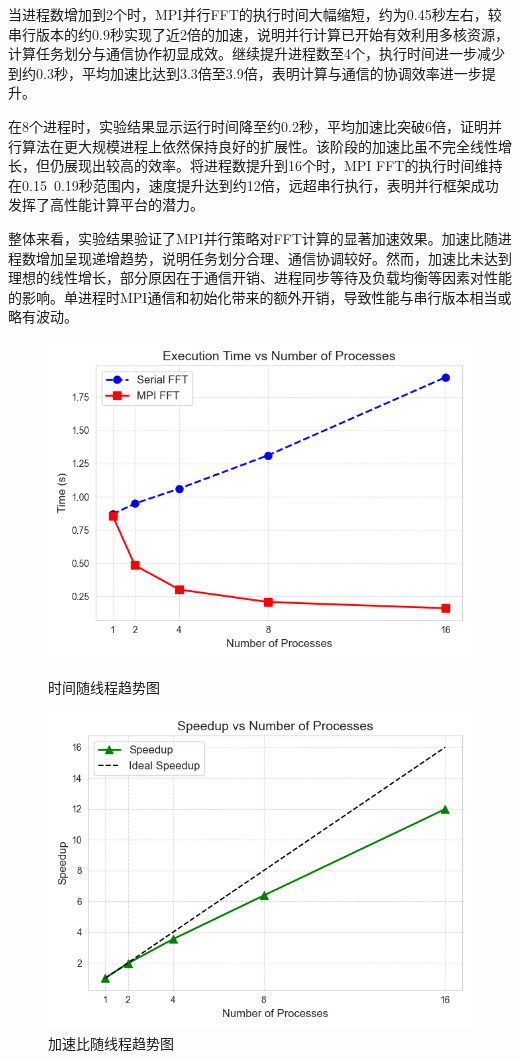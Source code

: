 \documentclass[a4paper, utf8]{ctexart}
\begin{document}
	当进程数增加到2个时，MPI并行FFT的执行时间大幅缩短，约为0.45秒左右，较串行版本的约0.9秒实现了近2倍的加速，说明并行计算已开始有效利用多核资源，计算任务划分与通信协作初显成效。继续提升进程数至4个，执行时间进一步减少到约0.3秒，平均加速比达到3.3倍至3.9倍，表明计算与通信的协调效率进一步提升。
	
	在8个进程时，实验结果显示运行时间降至约0.2秒，平均加速比突破6倍，证明并行算法在更大规模进程上依然保持良好的扩展性。该阶段的加速比虽不完全线性增长，但仍展现出较高的效率。将进程数提升到16个时，MPI FFT的执行时间维持在0.15~0.19秒范围内，速度提升达到约12倍，远超串行执行，表明并行框架成功发挥了高性能计算平台的潜力。
	
	整体来看，实验结果验证了MPI并行策略对FFT计算的显著加速效果。加速比随进程数增加呈现递增趋势，说明任务划分合理、通信协调较好。然而，加速比未达到理想的线性增长，部分原因在于通信开销、进程同步等待及负载均衡等因素对性能的影响。单进程时MPI通信和初始化带来的额外开销，导致性能与串行版本相当或略有波动。
	
	\begin{figure}[htbp]
		\centering
		\begin{minipage}{.45\textwidth}
			\centering
			\includegraphics[width=.8\textwidth]{./figure/TimevsProcess.png}
			\caption{时间随线程趋势图}
		\end{minipage}
		\begin{minipage}{.45\textwidth}
			\centering
			\includegraphics[width=.8\textwidth]{./figure/SpeedupvsProcess.png}
			\caption{加速比随线程趋势图}
		\end{minipage}
	\end{figure}
	
\end{document}
